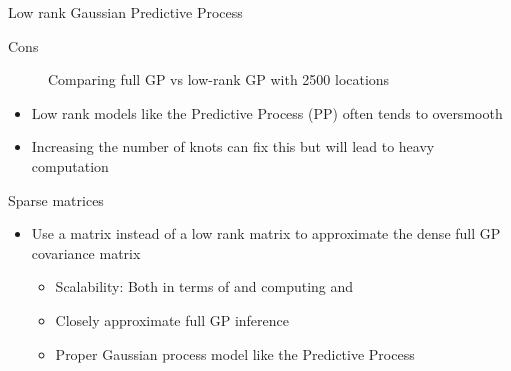 \begin{frame}{Low rank Gaussian Predictive Process}
{\begin{alertblock}{Cons}
\begin{figure}[t]
\begin{center}
				\end{center}
				\caption{Comparing full GP vs low-rank GP with 2500 locations} %
		\end{figure}
			\vskip -8mm 	\begin{itemize}
					\item Low rank models like the Predictive Process (PP) often tends to oversmooth
					\item Increasing the number of knots can fix this but will lead to heavy computation
				\end{itemize}
			\end{alertblock}
	}
\end{frame}

\begin{frame}{Sparse matrices}
	\begin{itemize}
		\item {} Use a  matrix instead of a low rank matrix to approximate the dense full GP covariance matrix
		\myitem {} 
		\begin{itemize} 
			\item Scalability: Both in terms of  and computing  and 
			\item Closely approximate full GP inference
			\item Proper Gaussian process model like the Predictive Process
	\end{itemize}
\end{itemize}
\end{frame}

